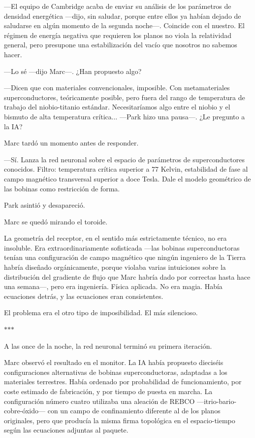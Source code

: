 \documentclass[11pt,a5paper,twoside]{book}
\begin{document}
—El equipo de Cambridge acaba de enviar su análisis de los parámetros de densidad energética —dijo, sin saludar, porque entre ellos ya habían dejado de saludarse en algún momento de la segunda noche—. Coincide con el nuestro. El régimen de energía negativa que requieren los planos no viola la relatividad general, pero presupone una estabilización del vacío que nosotros no sabemos hacer.

—Lo sé —dijo Marc—. ¿Han propuesto algo?

—Dicen que con materiales convencionales, imposible. Con metamateriales superconductores, teóricamente posible, pero fuera del rango de temperatura de trabajo del niobio-titanio estándar. Necesitaríamos algo entre el niobio y el bismuto de alta temperatura crítica... —Park hizo una pausa—. ¿Le pregunto a la IA?

Marc tardó un momento antes de responder.

—Sí. Lanza la red neuronal sobre el espacio de parámetros de superconductores conocidos. Filtro: temperatura crítica superior a 77 Kelvin, estabilidad de fase al campo magnético transversal superior a doce Tesla. Dale el modelo geométrico de las bobinas como restricción de forma.

Park asintió y desapareció.

Marc se quedó mirando el toroide.

La geometría del receptor, en el sentido más estrictamente técnico, no era insoluble. Era extraordinariamente sofisticada —las bobinas superconductoras tenían una configuración de campo magnético que ningún ingeniero de la Tierra habría diseñado orgánicamente, porque violaba varias intuiciones sobre la distribución del gradiente de flujo que Marc habría dado por correctas hasta hace una semana—, pero era ingeniería. Física aplicada. No era magia. Había ecuaciones detrás, y las ecuaciones eran consistentes.

El problema era el otro tipo de imposibilidad. El más silencioso.

\vspace{1.5em}
\begin{center}$\ast$\quad$\ast$\quad$\ast$\end{center}
\vspace{1.5em}

A las once de la noche, la red neuronal terminó su primera iteración.

Marc observó el resultado en el monitor. La IA había propuesto dieciséis configuraciones alternativas de bobinas superconductoras, adaptadas a los materiales terrestres. Había ordenado por probabilidad de funcionamiento, por coste estimado de fabricación, y por tiempo de puesta en marcha. La configuración número cuatro utilizaba una aleación de REBCO —itrio-bario-cobre-óxido— con un campo de confinamiento diferente al de los planos originales, pero que producía la misma firma topológica en el espacio-tiempo según las ecuaciones adjuntas al paquete.
\end{document}
